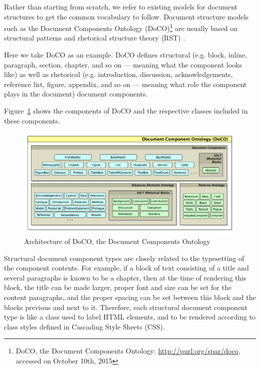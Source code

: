 Rather than starting from scratch, we refer to existing models for document structures to get the common vocabulary to follow. Document structure models such as the Document Components Ontology (DoCO)\footnote{DoCO, the Document Components Ontology: \url{http://purl.org/spar/doco}, accessed on October 10th, 2015} are usually based on structural patterns \cite{di2014dealing} and rhetorical structure theory (RST) \cite{taboada2006rhetorical}.

Here we take DoCO as an example. DoCO defines structural (e.g. block, inline, paragraph, section, chapter, and so on --- meaning what the component looks like) as well as rhetorical (e.g. introduction, discussion, acknowledgements, reference list, figure, appendix, and so on --- meaning what role the component plays in the document) document components.

Figure~\ref{fig:doco} shows the components of DoCO and the respective classes included in these components.
\begin{figure}
	\centering
	\includegraphics[width=\textwidth]{doco-architecture.png}
	\caption[Architecture of DoCO]{Architecture of DoCO, the Document Components Ontology}
	\label{fig:doco}
\end{figure}

Structural document component types are closely related to the typesetting of the component contents. For example, if a block of text consisting of a title and several paragraphs is known to be a chapter, then at the time of rendering this block, the title can be made larger, proper font and size can be set for the content paragraphs, and the proper spacing can be set between this block and the blocks previous and next to it. Therefore, each structural document component type is like a class used to label HTML elements, and to be rendered according to class styles defined in Cascading Style Sheets (CSS).

